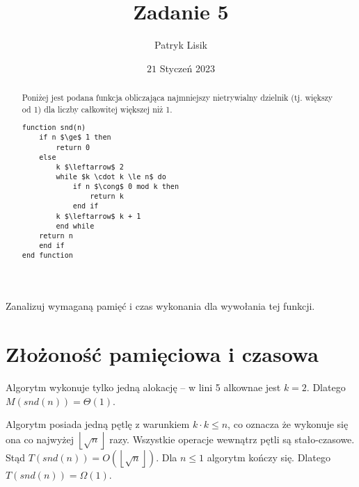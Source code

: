 \documentclass[12pt]{article}
\title{Zadanie 5}
\author{Patryk Lisik}
\date{\(21\) Styczeń  2023}
\newcommand{\floor}[1]{\left\lfloor #1  \right\rfloor}
\begin{document}
\markboth{\theauthor}{\thetitle}

\maketitle


\begin{abstract}
Poniżej jest podana funkcja obliczająca najmniejszy nietrywialny dzielnik (tj. większy od 1) dla liczby całkowitej większej niż 1.
\begin{lstlisting}[mathescape=true]
function snd(n)
    if n $\ge$ 1 then 
        return 0 
    else
        k $\leftarrow$ 2
        while $k \cdot k \le n$ do
            if n $\cong$ 0 mod k then
                return k
            end if
        k $\leftarrow$ k + 1
        end while
    return n 
    end if
end function
\end{lstlisting}
\end{abstract}
Zanalizuj wymaganą pamięć i czas wykonania dla wywołania tej funkcji.


\section{Złożoność pamięciowa i czasowa}
Algorytm wykonuje tylko jedną alokację -- w lini 5 alkownae jest $k=2$.
Dlatego $M(snd(n))=\Theta(1)$.

Algorytm posiada jedną pętlę z warunkiem $k\cdot k \le n $, co oznacza że wykonuje się ona co najwyżej $\floor{\sqrt{n}}$ razy.
Wszystkie operacje wewnątrz pętli są stało-czasowe.
Stąd $T(snd(n)) = O( \floor{\sqrt{n}} ) $. 
Dla $n \le 1$ algorytm kończy się. Dlatego $T(snd(n)) = \Omega(1) $. 
\end{document}
